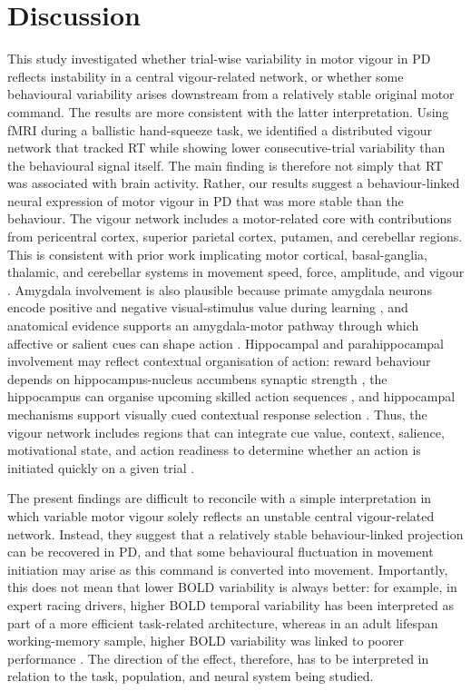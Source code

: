 \documentclass[utf8]{FrontiersinHarvard}
\begin{document}
\section{Discussion}
This study investigated whether trial-wise variability in motor vigour in PD reflects instability in a central vigour-related network, or whether some behavioural variability arises downstream from a relatively stable original motor command. The results are more consistent with the latter interpretation. Using fMRI during a ballistic hand-squeeze task, we identified a distributed vigour network that tracked RT while showing lower consecutive-trial variability than the behavioural signal itself. The main finding is therefore not simply that RT was associated with brain activity. Rather, our results suggest a behaviour-linked neural expression of motor vigour in PD that was more stable than the behaviour. The vigour network includes a motor-related core with contributions from pericentral cortex, superior parietal cortex, putamen, and cerebellar regions. This is consistent with prior work implicating motor cortical, basal-ganglia, thalamic, and cerebellar systems in movement speed, force, amplitude, and vigour \citep{anderson2012ecog,dudman2016basal,shirinbayan2019cortical,spraker2007basalganglia,turner2010basal,yttri2016opponent,niv2007tonic,zenon2016dopamine}. Amygdala involvement is also plausible because primate amygdala neurons encode positive and negative visual-stimulus value during learning \citep{paton2006primate}, and anatomical evidence supports an amygdala-motor pathway through which affective or salient cues can shape action \citep{grezes2014direct}. Hippocampal and parahippocampal involvement may reflect contextual organisation of action: reward behaviour depends on hippocampus-nucleus accumbens synaptic strength \citep{legates2018reward}, the hippocampus can organise upcoming skilled action sequences \citep{yewbrey2024hippocampus}, and hippocampal mechanisms support visually cued contextual response selection \citep{kim2012hippocampus}. Thus, the vigour network includes regions that can integrate cue value, context, salience, motivational state, and action readiness to determine whether an action is initiated quickly on a given trial \citep{wallis2007orbitofrontal,rolls2020orbitofrontal,pierrieau2025changes}.



The present findings are difficult to reconcile with a simple interpretation in which variable motor vigour solely reflects an unstable central vigour-related network. Instead, they suggest that a relatively stable behaviour-linked projection can be recovered in PD, and that some behavioural fluctuation in movement initiation may arise as this command is converted into movement. Importantly, this does not mean that lower BOLD variability is always better: for example, in expert racing drivers, higher BOLD temporal variability has been interpreted as part of a more efficient task-related architecture, whereas in an adult lifespan working-memory sample, higher BOLD variability was linked to poorer performance \citep{grady2014understanding,boylan2021greater}. The direction of the effect, therefore, has to be interpreted in relation to the task, population, and neural system being studied.
\end{document}
